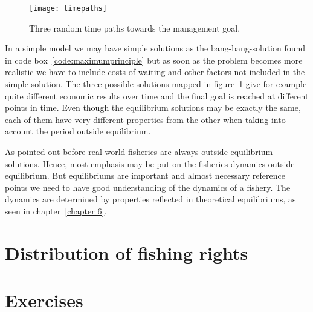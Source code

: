 \documentclass[11pt,fleqn]{book} %
\begin{document}
\begin{figure}[ht]
\centering
\texttt{[image: timepaths]}
\caption{Three random time paths towards the management goal.}
\label{fig:timepaths}
\end{figure}

In a simple model we may have simple solutions as the bang-bang-solution found in code box~\ref{code:maximumprinciple} but as soon as the problem becomes more realistic we have to include costs of waiting and other factors not included in the simple solution. The three possible solutions mapped in figure~\ref{fig:timepaths} give for example quite different economic results over time and the final goal is reached at different points in time. Even though the equilibrium solutions may be exactly the same, each of them have very different properties from the other when taking into account the period outside equilibrium. 

As pointed out before real world fisheries are always outside equilibrium solutions. Hence, most emphasis may be put on the fisheries dynamics outside equilibrium. But equilibriums are important and almost necessary reference points we need to have good understanding of the dynamics of a fishery. The dynamics are determined by properties reflected in theoretical equilibriums, as seen in chapter~\ref{chapter 6}.

\section{Distribution of fishing rights}



\section*{Exercises}
\end{document}
